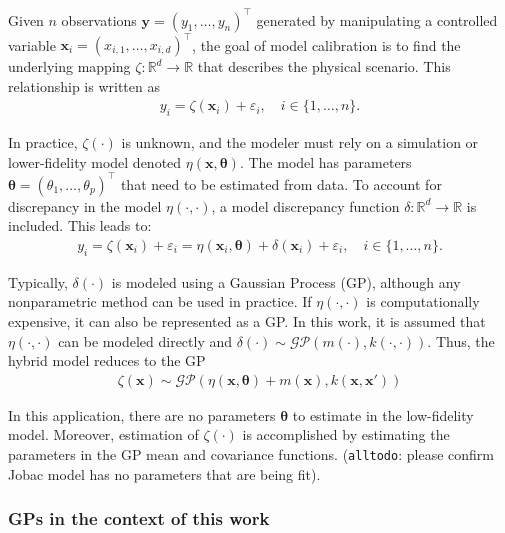 \documentclass[journal=jacsat,manuscript=article]{achemso}
\newcommand{\alltodo}[1]{{\color{Cyan} (\texttt{alltodo}: #1)}}
\newcommand{\xvec}{\ensuremath{\mathbf{x}}}
\begin{document}
 Given $n$ observations $\mathbf{y}=(y_1,\dots,y_n)^\intercal$ generated by manipulating a controlled variable $\xvec_i = (x_{i,1},\dots,x_{i,d})^\intercal$, the goal of model calibration is to find the underlying mapping $\zeta: \mathbb{R}^d \rightarrow \mathbb{R}$ that describes the physical scenario. This relationship is written as
 \begin{gather}
     y_i = \zeta(\mathbf{x}_i) + \varepsilon_i, \quad i \in \{1,\dots,n\}. \label{eq: trueprocess}
 \end{gather}

 In practice, $\zeta(\cdot)$ is unknown, and the modeler must rely on a simulation or lower-fidelity model denoted $\eta(\mathbf{x}, \boldsymbol{\theta})$. The model has parameters $\boldsymbol{\theta}=(\theta_1,\dots,\theta_p)^\intercal$ that need to be estimated from data. To account for discrepancy in the model $\eta(\cdot,\cdot)$, a model discrepancy function $\delta: \mathbb{R}^d \rightarrow \mathbb{R}$ is included. This leads to:
 \begin{gather}
      y_i = \zeta(\mathbf{x}_i) + \varepsilon_i = \eta(\mathbf{x}_i,\boldsymbol{\theta}) + \delta(\mathbf{x}_i) + \varepsilon_i, \quad i \in \{1,\dots,n\}.
 \end{gather}

 Typically, $\delta(\cdot)$ is modeled using a Gaussian Process (GP), although any nonparametric method can be used in practice. If $\eta(\cdot,\cdot)$ is computationally expensive, it can also be represented as a GP. In this work, it is assumed that $\eta(\cdot,\cdot)$ can be modeled directly and $\delta(\cdot)\sim \mathcal{GP}(m(\cdot),k(\cdot,\cdot))$. Thus, the hybrid model reduces to the GP
 \begin{gather}
     \zeta(\mathbf{x}) \sim \mathcal{GP}(\eta(\mathbf{x},\boldsymbol{\theta}) + m(\mathbf{x}), k(\mathbf{x}, \mathbf{x}'))
 \end{gather}

 In this application, there are no parameters $\boldsymbol{\theta}$ to estimate in the low-fidelity model. Moreover, estimation of $\zeta(\cdot)$ is accomplished by estimating the parameters in the GP mean and covariance functions.
 \alltodo{please confirm Jobac model has no parameters that are being fit}.






\subsubsection{GPs in the context of this work}
\end{document}
